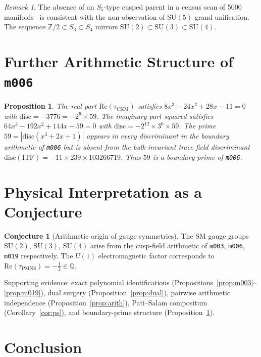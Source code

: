 \documentclass[11pt,a4paper]{article}
\newtheorem{proposition}[theorem]{Proposition}
\theoremstyle{definition}
\newtheorem{conjecture}[theorem]{Conjecture}
\theoremstyle{remark}
\newtheorem{remark}[theorem]{Remark}
\newcommand{\Z}{\mathbb{Z}}
\newcommand{\Q}{\mathbb{Q}}
\newcommand{\mfld}[1]{\texttt{#1}}
\newcommand{\SU}{\mathrm{SU}}
\newcommand{\disc}{\mathrm{disc}}
\begin{document}
\begin{remark}
The absence of an $S_5$-type cusped parent in a census scan
of 5000 manifolds~\cite{GentryUnified} is consistent with
the non-observation of $\SU(5)$ grand unification.
The sequence $\Z/2\subset S_3\subset S_4$ mirrors
$\SU(2)\subset\SU(3)\subset\SU(4)$.
\end{remark}

\section{Further Arithmetic Structure of \mfld{m006}}

\begin{proposition}\label{prop:coords}
The real part $\mathrm{Re}(\tau_{\mathrm{CKM}})$ satisfies
$8x^3-24x^2+28x-11=0$ with $\disc=-3776=-2^6\times59$.
The imaginary part squared satisfies
$64x^3-192x^2+144x-59=0$
with $\disc=-2^{12}\times3^6\times59$.
The prime $59=|\disc(x^3+2x+1)|$ appears in every discriminant
in the boundary arithmetic of \mfld{m006} but is absent from
the bulk invariant trace field discriminant
$\disc(\mathrm{ITF})=-11\times239\times103266719$.
Thus $59$ is a boundary prime of \mfld{m006}.
\end{proposition}

\section{Physical Interpretation as a Conjecture}

\begin{conjecture}[Arithmetic origin of gauge symmetries]\label{conj:gauge}
The SM gauge groups $\SU(2)$, $\SU(3)$, $\SU(4)$ arise
from the cusp-field arithmetic of \mfld{m003}, \mfld{m006},
\mfld{m019} respectively.
The $U(1)$ electromagnetic factor corresponds to
$\mathrm{Re}(\tau_{\mathrm{PMNS}})=-\tfrac12\in\Q$.
\end{conjecture}

Supporting evidence: exact polynomial identifications
(Propositions~\ref{prop:m003}--\ref{prop:m019}),
dual surgery (Proposition~\ref{prop:dual}),
pairwise arithmetic independence (Proposition~\ref{prop:arith}),
Pati--Salam compositum (Corollary~\ref{cor:ps}),
and boundary-prime structure (Proposition~\ref{prop:coords}).

\section{Conclusion}
\end{document}
